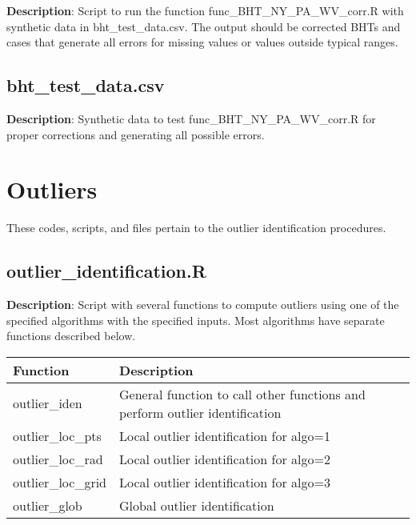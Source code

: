 \documentclass[12pt,a4paper]{article}
\begin{document}
\textbf{Description}: Script to run the function \textsf{func\_BHT\_NY\_PA\_WV\_corr.R} with synthetic data in \textsf{bht\_test\_data.csv}. The output should be corrected BHTs and cases that generate all errors for missing values or values outside typical ranges.

\subsection*{\textsf{bht\_test\_data.csv}}

\textbf{Description}: Synthetic data to test \textsf{func\_BHT\_NY\_PA\_WV\_corr.R} for proper corrections and generating all possible errors.

\newpage

\section*{Outliers}
These codes, scripts, and files pertain to the outlier identification procedures.

\subsection*{\textsf{outlier\_identification.R}}

\textbf{Description}: Script with several functions to compute outliers using one of the specified algorithms with the specified inputs. Most algorithms have separate functions described below.

\begin{table}[H]
\begin{tabular} {p{2.5cm} p{10cm}}
\hline
\textbf{Function} & \textbf{Description}\\
\hline
\textsf{outlier\_iden} & General function to call other functions and perform outlier identification \\
\textsf{outlier\_loc\_pts} & Local outlier identification for \textsf{algo}=1\\
\textsf{outlier\_loc\_rad} & Local outlier identification for \textsf{algo}=2\\
\textsf{outlier\_loc\_grid} & Local outlier identification for \textsf{algo}=3\\
\textsf{outlier\_glob} & Global outlier identification\\
\hline
\end{tabular} 
\end{table}
\end{document}
